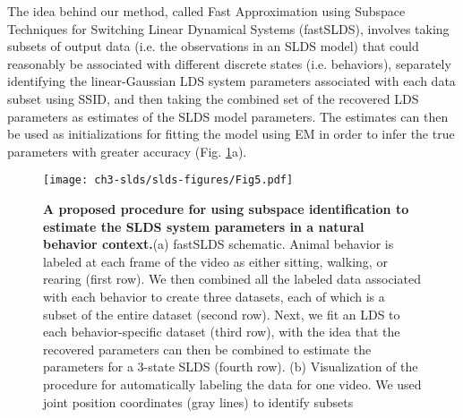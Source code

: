The idea behind our method, called Fast Approximation using Subspace Techniques for Switching Linear Dynamical Systems (fastSLDS), involves taking subsets of output data (i.e. the observations in an SLDS model) that could reasonably be associated with different discrete states (i.e. behaviors), separately identifying the linear-Gaussian LDS system parameters associated with each data subset using SSID, and then taking the combined set of the recovered LDS parameters as estimates of the SLDS model parameters. The estimates can then be used as initializations for fitting the model using EM in order to infer the true parameters with greater accuracy (Fig. \ref{fig:slds:5}a).    
\begin{figure}[h!]
  \begin{center}
    \texttt{[image: ch3-slds/slds-figures/Fig5.pdf]}
    \caption[A proposed procedure for using subspace identification to estimate the SLDS system parameters in a natural behavior context]{\textbf{A proposed procedure for using subspace identification to estimate the SLDS system parameters in a natural behavior context.}(a) fastSLDS schematic. Animal behavior is labeled at each frame of the video as either sitting, walking, or rearing (first row). We then combined all the labeled data associated with each behavior to create three datasets, each of which is a subset of the entire dataset (second row). Next, we fit an LDS to each behavior-specific dataset (third row), with the idea that the recovered parameters can then be combined to estimate the parameters for a 3-state SLDS (fourth row). (b) Visualization of the procedure for automatically labeling the data for one video. We used joint position coordinates (gray lines) to identify subsets}
    \label{fig:slds:5}
  \end{center}
  \vspace{-1.0cm}
\end{figure}

\begin{figure}[t!]
\end{figure}



